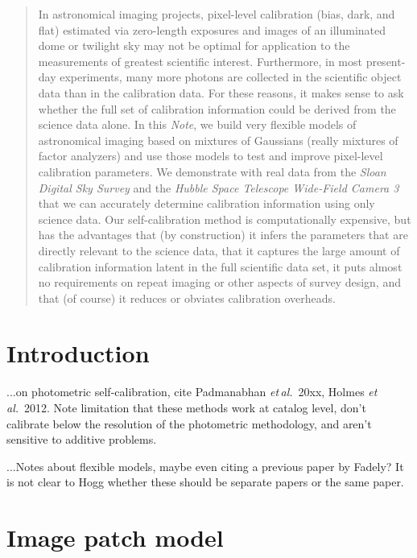 \documentclass[12pt]{article}
\newcommand{\documentname}{\textsl{Note}}
\newcommand{\foreign}[1]{\textsl{#1}}
\newcommand{\etal}{\foreign{et\,al.}}
\newcommand{\project}[1]{\textsl{#1}}
\begin{document}
\sloppy\sloppypar


\begin{abstract}
In astronomical imaging projects, pixel-level calibration (bias, dark,
and flat) estimated via zero-length exposures and images of an
illuminated dome or twilight sky may not be optimal for application to
the measurements of greatest scientific interest.  Furthermore, in
most present-day experiments, many more photons are collected in the
scientific object data than in the calibration data.  For these
reasons, it makes sense to ask whether the full set of calibration
information could be derived from the science data alone.  In this
\documentname, we build very flexible models of astronomical imaging
based on mixtures of Gaussians (really mixtures of factor analyzers)
and use those models to test and improve pixel-level calibration
parameters.  We demonstrate with real data from the \project{Sloan
  Digital Sky Survey} and the \project{Hubble Space Telescope
  Wide-Field Camera 3} that we can accurately determine calibration
information using only science data.  Our self-calibration method is
computationally expensive, but has the advantages that (by
construction) it infers the parameters that are directly relevant to
the science data, that it captures the large amount of calibration
information latent in the full scientific data set, it puts almost no
requirements on repeat imaging or other aspects of survey design, and
that (of course) it reduces or obviates calibration overheads.
\end{abstract}

\section{Introduction}

...on photometric self-calibration, cite Padmanabhan \etal~20xx, Holmes
\etal~2012.  Note limitation that these methods work at catalog level,
don't calibrate below the resolution of the photometric methodology,
and aren't sensitive to additive problems.

...Notes about flexible models, maybe even citing a previous paper by
Fadely?  It is not clear to Hogg whether these should be separate
papers or the same paper.

\section{Image patch model}
\end{document}
